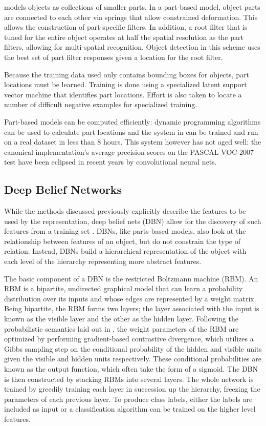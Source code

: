 \documentclass[10pt,twocolumn,letterpaper]{article}
\begin{document}
\cite{PartModels} models objects as collections of smaller parts.
In a part-based model, object parts are connected to each other via springs that
allow constrained deformation. This allows the construction of part-specific filters.
In addition, a root filter that is tuned for the entire object operates at half
the spatial resolution as the part filters, allowing for multi-spatial recognition.
Object detection in this scheme uses the best set of part filter responses given a
location for the root filter.

Because the training data used only contains bounding boxes for objects,
part locations must be learned. Training is done using a specialized latent support
vector machine that identifies part locations. Effort is also taken to locate a
number of difficult negative examples for specialized training.

Part-based models can be computed efficiently: dynamic programming algorithms
can be used to calculate part locations and the system in \cite{PartModels} can be trained
and run on a real dataset in less than 8 hours.
This system however has not aged well: the canonical implementation's average precision
scores on the PASCAL VOC 2007 \cite{PascalVOC} test have been eclipsed in recent years
by convolutional neural nets.

\subsection{Deep Belief Networks}

While the methods discussed previously explicitly describe the features to be used
by the representation, deep belief nets (DBN) allow for the discovery of such features
from a training set \cite{HintonDBN} \cite{CDBN}.
DBNs, like parts-based models, also look at the relationship between features of an object,
but do not constrain the type of relation.
Instead, DBNs build a hierarchical representation of the object with each level of the hierarchy
representing more abstract features.

The basic component of a DBN is the restricted Boltzmann machine (RBM).
An RBM is a bipartite, undirected graphical model that can learn a probability distribution
over its inputs and whose edges are represented by a weight matrix.
Being bipartite, the RBM forms two layers; the layer associated with the input is known
as the visible layer and the other as the hidden layer.
Following the probabilistic semantics laid out in \cite{CDBN}, the weight parameters of the RBM
are optimized by performing gradient-based contrastive divergence, which utilizes a
Gibbs sampling step on the conditional probability of the hidden and visible units given
the visible and hidden units respectively.
These conditional probabilities are known as the output function, which often take the form of a sigmoid.
The DBN is then constructed by stacking RBMs into several layers.
The whole network is trained by greedily training each layer in succession up the hierarchy,
freezing the parameters of each previous layer.
To produce class labels, either the labels are included as input or a classification algorithm
can be trained on the higher level features.
\end{document}
